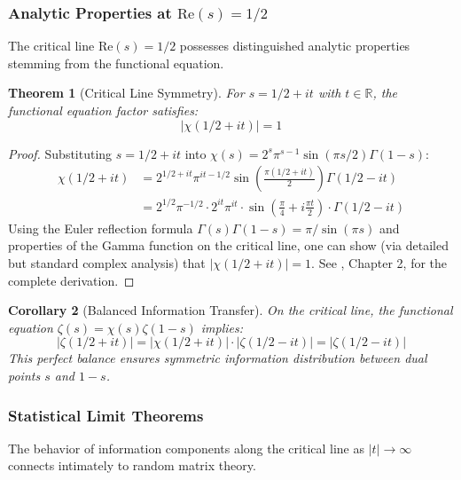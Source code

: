 \documentclass[12pt]{article}
\theoremstyle{plain}
\newtheorem{theorem}{Theorem}[section]
\newtheorem{corollary}[theorem]{Corollary}
\theoremstyle{definition}
\begin{document}
\subsubsection{Analytic Properties at $\text{Re}(s) = 1/2$}

The critical line $\text{Re}(s) = 1/2$ possesses distinguished analytic properties stemming from the functional equation.

\begin{theorem}[Critical Line Symmetry]\label{thm:critical_symmetry}
For $s = 1/2 + it$ with $t \in \mathbb{R}$, the functional equation factor satisfies:
\begin{equation}
|\chi(1/2 + it)| = 1
\end{equation}
\end{theorem}

\begin{proof}
Substituting $s = 1/2 + it$ into $\chi(s) = 2^s \pi^{s-1} \sin(\pi s/2) \Gamma(1-s)$:
\begin{align*}
\chi(1/2 + it) &= 2^{1/2+it} \pi^{it-1/2} \sin\left(\frac{\pi(1/2+it)}{2}\right) \Gamma(1/2-it) \\
&= 2^{1/2} \pi^{-1/2} \cdot 2^{it} \pi^{it} \cdot \sin\left(\frac{\pi}{4} + i\frac{\pi t}{2}\right) \cdot \Gamma(1/2-it)
\end{align*}
Using the Euler reflection formula $\Gamma(s)\Gamma(1-s) = \pi/\sin(\pi s)$ and properties of the Gamma function on the critical line, one can show (via detailed but standard complex analysis) that $|\chi(1/2+it)| = 1$. See \cite{titchmarsh1986}, Chapter 2, for the complete derivation.
\end{proof}

\begin{corollary}[Balanced Information Transfer]\label{cor:balanced_transfer}
On the critical line, the functional equation $\zeta(s) = \chi(s)\zeta(1-s)$ implies:
$$|\zeta(1/2+it)| = |\chi(1/2+it)| \cdot |\zeta(1/2-it)| = |\zeta(1/2-it)|$$
This perfect balance ensures symmetric information distribution between dual points $s$ and $1-s$.
\end{corollary}

\subsubsection{Statistical Limit Theorems}

The behavior of information components along the critical line as $|t| \to \infty$ connects intimately to random matrix theory.
\end{document}
